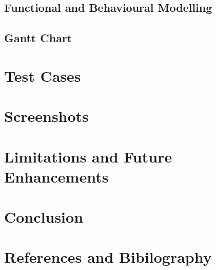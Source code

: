 \documentclass[12pt,a4paper]{report}
\begin{document}
\section{Functional and Behavioural Modelling}
\section{Gantt Chart}
\newpage
\chapter{Test Cases}
\newpage
\chapter{Screenshots}
\newpage
\chapter{Limitations and Future Enhancements}
\newpage
\chapter{Conclusion}
\newpage
\chapter{References and Bibilography}
\end{document}
